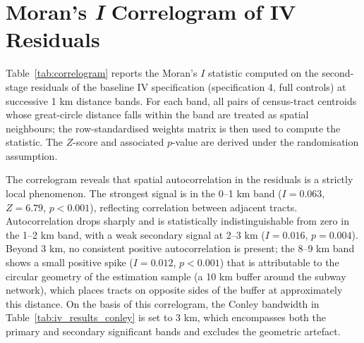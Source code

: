 \section{Moran's \textit{I} Correlogram of IV Residuals}
\label{s:appendix_conley}

Table~\ref{tab:correlogram} reports the Moran's $I$ statistic computed on the second-stage residuals of the baseline IV specification (specification 4, full controls) at successive 1 km distance bands. For each band, all pairs of census-tract centroids whose great-circle distance falls within the band are treated as spatial neighbours; the row-standardised weights matrix is then used to compute the statistic. The $Z$-score and associated $p$-value are derived under the randomisation assumption.

The correlogram reveals that spatial autocorrelation in the residuals is a strictly local phenomenon. The strongest signal is in the 0--1 km band ($I = 0.063$, $Z = 6.79$, $p < 0.001$), reflecting correlation between adjacent tracts. Autocorrelation drops sharply and is statistically indistinguishable from zero in the 1--2 km band, with a weak secondary signal at 2--3 km ($I = 0.016$, $p = 0.004$). Beyond 3 km, no consistent positive autocorrelation is present; the 8--9 km band shows a small positive spike ($I = 0.012$, $p < 0.001$) that is attributable to the circular geometry of the estimation sample (a 10 km buffer around the subway network), which places tracts on opposite sides of the buffer at approximately this distance. On the basis of this correlogram, the Conley bandwidth in Table~\ref{tab:iv_results_conley} is set to 3 km, which encompasses both the primary and secondary significant bands and excludes the geometric artefact.

